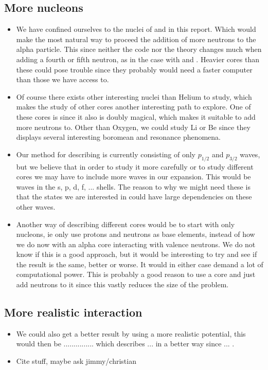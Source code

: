 \documentclass[../main/report.tex]{subfiles}
\begin{document}
\subsection{More nucleons}
  \begin{itemize}
    \item We have confined ourselves to the nuclei of  and  in this report.
    Which would make the most natural way to proceed the addition of more neutrons to the alpha particle.
    This since neither the code nor the theory changes much when adding a fourth or fifth neutron, as in the case with  and .
    Heavier cores than these could pose trouble since they probably would need a faster computer than those we have access to.

   \item Of course there exists other interesting nuclei than Helium to study, which makes the study of other cores another interesting path to explore.
   One of these cores is  since it also is doubly magical, which makes it suitable to add more neutrons to.
   Other than Oxygen, we could study Li or Be since they displays several interesting boromean and resonance phenomena.

   \item Our method for describing  is currently consisting of only $p_{1/2}$ and $p_{3/2}$ waves, but we believe that in order to study it more carefully or to study different cores we may have to include more waves in our expansion.
   This would be waves in the s, p, d, f, ... shells.
   The reason to why we might need these is that the states we are interested in could have large dependencies on these other waves.

   \item Another way of describing different cores would be to start with only nucleons, ie only use protons and neutrons as base elements, instead of how we do now with an alpha core interacting with valence neutrons.
   We do not know if this is a good approach, but it would be interesting to try and see if the result is the same, better or worse.
   It would in either case demand a lot of computational power.
   This is probably a good reason to use a core and just add neutrons to it since this vastly reduces the size of the problem.
  \end{itemize}

\subsection{More realistic interaction}
  \begin{itemize}
   \item We could also get a better result by using a more realistic potential, this would then be ............... which describes ... in a better way since ... .
    \item Cite stuff, maybe ask jimmy/christian
  \end{itemize}
\end{document}
